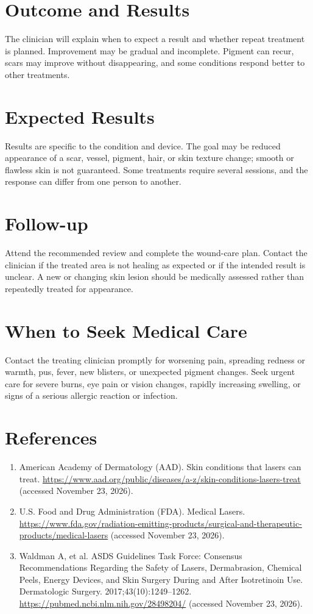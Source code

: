 \section*{Outcome and Results}
The clinician will explain when to expect a result and whether repeat treatment is planned. Improvement may be gradual and incomplete. Pigment can recur, scars may improve without disappearing, and some conditions respond better to other treatments.

\section*{Expected Results}
Results are specific to the condition and device. The goal may be reduced appearance of a scar, vessel, pigment, hair, or skin texture change; smooth or flawless skin is not guaranteed. Some treatments require several sessions, and the response can differ from one person to another.

\section*{Follow-up}
Attend the recommended review and complete the wound-care plan. Contact the clinician if the treated area is not healing as expected or if the intended result is unclear. A new or changing skin lesion should be medically assessed rather than repeatedly treated for appearance.

\section*{When to Seek Medical Care}
Contact the treating clinician promptly for worsening pain, spreading redness or warmth, pus, fever, new blisters, or unexpected pigment changes. Seek urgent care for severe burns, eye pain or vision changes, rapidly increasing swelling, or signs of a serious allergic reaction or infection.

\section*{References}
\begin{enumerate}
  \item American Academy of Dermatology (AAD). Skin conditions that lasers can treat. \url{https://www.aad.org/public/diseases/a-z/skin-conditions-lasers-treat} (accessed November 23, 2026).
  \item U.S. Food and Drug Administration (FDA). Medical Lasers. \url{https://www.fda.gov/radiation-emitting-products/surgical-and-therapeutic-products/medical-lasers} (accessed November 23, 2026).
  \item Waldman A, et al. ASDS Guidelines Task Force: Consensus Recommendations Regarding the Safety of Lasers, Dermabrasion, Chemical Peels, Energy Devices, and Skin Surgery During and After Isotretinoin Use. Dermatologic Surgery. 2017;43(10):1249--1262. \url{https://pubmed.ncbi.nlm.nih.gov/28498204/} (accessed November 23, 2026).
\end{enumerate}

\clearpage
